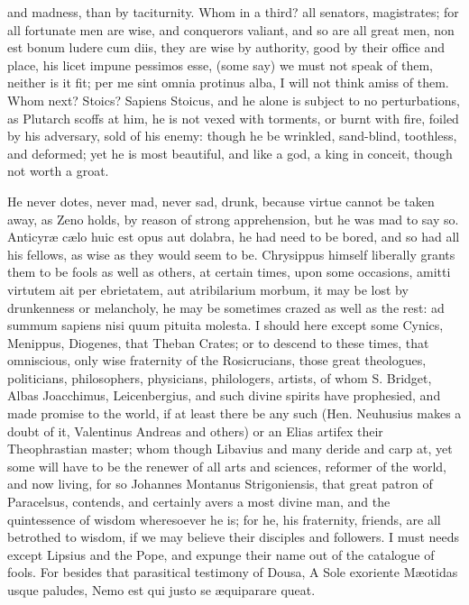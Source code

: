 {and madness, than by taciturnity. Whom in a third? all senators,
magistrates; for all fortunate men are wise, and conquerors valiant,
and so are all great men, non est bonum ludere cum diis, they are wise
by authority, good by their office and place, his licet impune pessimos
esse, (some say) we must not speak of them, neither is it fit; per me
sint omnia protinus alba, I will not think amiss of them. Whom next?
Stoics? Sapiens Stoicus, and he alone is subject to no perturbations,
as Plutarch scoffs at him, he is not vexed with torments, or burnt
with fire, foiled by his adversary, sold of his enemy: though he be
wrinkled, sand-blind, toothless, and deformed; yet he is most
beautiful, and like a god, a king in conceit, though not worth a groat.

He never dotes, never mad, never sad, drunk, because virtue cannot be
taken away, as Zeno holds, by reason of strong apprehension, but
he was mad to say so. Anticyr\ae{} c\ae{}lo huic est opus aut dolabra,
he had need to be bored, and so had all his fellows, as wise as they
would seem to be. Chrysippus himself liberally grants them to be fools
as well as others, at certain times, upon some occasions, amitti
virtutem ait per ebrietatem, aut atribilarium morbum, it may be lost by
drunkenness or melancholy, he may be sometimes crazed as well as the
rest: ad summum sapiens nisi quum pituita molesta. I should here
except some Cynics, Menippus, Diogenes, that Theban Crates; or to
descend to these times, that omniscious, only wise fraternity of
the Rosicrucians, those great theologues, politicians, philosophers,
physicians, philologers, artists, \etc{} of whom S. Bridget, Albas
Joacchimus, Leicenbergius, and such divine spirits have prophesied, and
made promise to the world, if at least there be any such (Hen.
Neuhusius makes a doubt of it,  Valentinus Andreas and
others) or an Elias artifex their Theophrastian master; whom though
Libavius and many deride and carp at, yet some will have to be the
renewer of all arts and sciences, reformer of the world, and now
living, for so Johannes Montanus Strigoniensis, that great patron of
Paracelsus, contends, and certainly avers a most divine man, and
the quintessence of wisdom wheresoever he is; for he, his fraternity,
friends, \etc{} are all betrothed to wisdom, if we may believe their
disciples and followers. I must needs except Lipsius and the Pope, and
expunge their name out of the catalogue of fools. For besides that
parasitical testimony of Dousa,
A Sole exoriente M\ae{}otidas usque paludes,
Nemo est qui justo se \ae{}quiparare queat.

}
